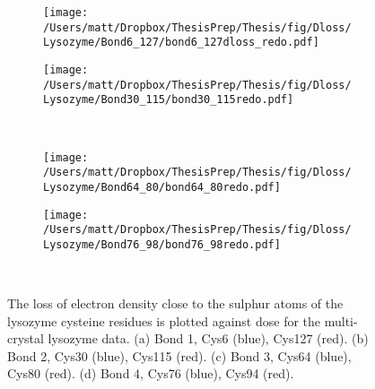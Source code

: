 \begin{figure}[!htbp]
\centering
\begin{subfigure}{.45\textwidth}
\centering 
  \texttt{[image: /Users/matt/Dropbox/ThesisPrep/Thesis/fig/Dloss/Lysozyme/Bond6\_127/bond6\_127dloss\_redo.pdf]}
  \caption{}
  \label{fig:Dloss_bond1}
\end{subfigure}
\begin{subfigure}{.45\textwidth}
  \centering
  \texttt{[image: /Users/matt/Dropbox/ThesisPrep/Thesis/fig/Dloss/Lysozyme/Bond30\_115/bond30\_115redo.pdf]}
  \caption{}
  \label{fig:Dloss_bond2}
\end{subfigure}\\
\begin{subfigure}{.45\textwidth}
  \centering
  \texttt{[image: /Users/matt/Dropbox/ThesisPrep/Thesis/fig/Dloss/Lysozyme/Bond64\_80/bond64\_80redo.pdf]}
  \caption{}
  \label{fig:Dloss_bond3}
\end{subfigure}
\begin{subfigure}{.45\textwidth}
  \centering
  \texttt{[image: /Users/matt/Dropbox/ThesisPrep/Thesis/fig/Dloss/Lysozyme/Bond76\_98/bond76\_98redo.pdf]}
  \caption{}
  \label{fig:Dloss_bond4}
\end{subfigure}\\
\caption[Quantifying radiation damage at Lysozyme Disulphide Bonds]{The loss of electron density close to the sulphur atoms of the lysozyme cysteine residues is plotted against dose for the multi-crystal lysozyme data. (a) Bond 1, Cys6 (blue), Cys127 (red). (b) Bond 2, Cys30 (blue), Cys115 (red). (c) Bond 3, Cys64 (blue), Cys80 (red). (d) Bond 4, Cys76 (blue), Cys94 (red).\label{fig:Dloss_disulphides}}
\end{figure}


